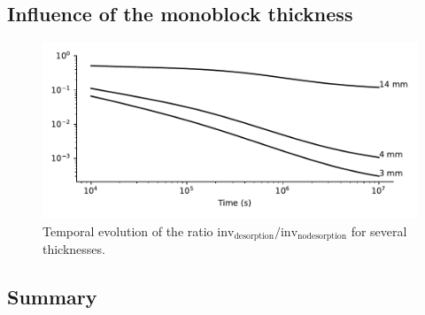 \subsection{Influence of the monoblock thickness}

\begin{figure}
    \centering
    \includegraphics[width=\linewidth]{Figures/Chapter3/monoblocks/3D_monoblocks/influence_of_thickness.pdf}
    \caption{Temporal evolution of the ratio $\mathrm{inv}_\mathrm{desorption} / \mathrm{inv}_\mathrm{no desorption}$ for several thicknesses.}
\end{figure}

\subsection{Summary}